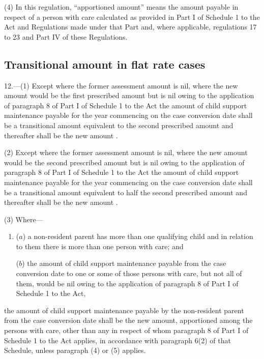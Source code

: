 \documentclass[12pt,a4paper]{article}
\begin{document}
(4) In this regulation, “apportioned amount” means the amount payable in respect of a person with care calculated as provided in Part I of Schedule 1 to the Act and Regulations made under that Part and, where applicable, regulations 17 to 23 and Part IV of these Regulations.


\subsection[12. Transitional amount in flat rate cases]{Transitional amount in flat rate cases}

12.---(1)  Except where the former assessment amount is nil, where the new amount would be the first prescribed amount but is nil owing to the application of paragraph 8 of Part I of Schedule 1 to the Act the amount of child support maintenance payable for the year commencing on the case conversion date shall be a transitional amount equivalent to the second prescribed amount and thereafter shall be the new amount%
.

(2) Except where the former assessment amount is nil, where the new amount would be the second prescribed amount but is nil owing to the application of paragraph 8 of Part I of Schedule 1 to the Act the amount of child support maintenance payable for the year commencing on the case conversion date shall be a transitional amount equivalent to half the second prescribed amount and thereafter shall be the new amount%
.

(3) Where—
\begin{enumerate}\item[]
($a$) a non-resident parent has more than one qualifying child and in relation to them there is more than one person with care; and

($b$) the amount of child support maintenance payable from the case conversion date to one or some of those persons with care, but not all of them, would be nil owing to the application of paragraph 8 of Part I of Schedule 1 to the Act,
\end{enumerate}
the amount of child support maintenance payable by the non-resident parent from the case conversion date shall be the new amount, apportioned 
among the persons with care, other than any in respect of whom paragraph 8 of Part I of Schedule 1 to the Act applies, in accordance with paragraph 6(2) of that Schedule, unless paragraph (4) or (5) applies.  %
\end{document}
